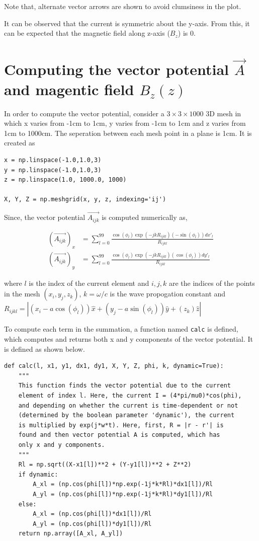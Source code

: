 \documentclass[12pt, a4paper]{article}
\begin{document}
Note that, alternate vector arrows are shown to avoid clumsiness in the plot.

It can be observed that the current is symmetric about the y-axis. From this, it can be expected that the magnetic field along z-axis ($B_z$) is 0.

\section{Computing the vector potential $\vec{A}$ and magentic field $B_z(z)$}

In order to compute the vector potential, consider a $3 \times 3 \times 1000$ 3D mesh in which x varies from -1cm to 1cm, y varies from -1cm to 1cm and z varies from 1cm to 1000cm. The seperation between each mesh point in a plane is 1cm. It is created as 

\begin{lstlisting}
x = np.linspace(-1.0,1.0,3)  
y = np.linspace(-1.0,1.0,3)
z = np.linspace(1.0, 1000.0, 1000)

X, Y, Z = np.meshgrid(x, y, z, indexing='ij')
\end{lstlisting}

Since, the vector potential $\vec{A_{ijk}}$ is computed numerically as,

\begin{align*}
\left( \vec{A_{ijk}} \right)_x &= \sum_{l = 0}^{99} \frac{\cos(\phi_l)\exp(-jkR_{ijkl})(-\sin(\phi_l))dx'_l}{R_{ijkl}} \\
\left( \vec{A_{ijk}} \right)_y &= \sum_{l = 0}^{99} \frac{\cos(\phi_l)\exp(-jkR_{ijkl})(\cos(\phi_l))dy'_l}{R_{ijkl}}
\end{align*}

where $l$ is the index of the current element and $i, j, k$ are the indices of the points in the mesh $(x_i, y_j, z_k)$, $k = \omega/c$ is the wave propogation constant and $R_{ijkl} = |(x_i - a \cos(\phi_l))\hat{x} + (y_j - a \sin(\phi_l))\hat{y} + (z_k)\hat{z}|$

To compute each term in the summation, a function named \texttt{calc} is defined, which computes and returns both x and y components of the vector potential. It is defined as shown below.

\begin{lstlisting}
def calc(l, x1, y1, dx1, dy1, X, Y, Z, phi, k, dynamic=True):
    """
    This function finds the vector potential due to the current
    element of index l. Here, the current I = (4*pi/mu0)*cos(phi),
    and depending on whether the current is time-dependent or not
    (determined by the boolean parameter 'dynamic'), the current
    is multiplied by exp(j*w*t). Here, first, R = |r - r'| is 
    found and then vector potential A is computed, which has 
    only x and y components.
    """
    Rl = np.sqrt((X-x1[l])**2 + (Y-y1[l])**2 + Z**2)
    if dynamic:
        A_xl = (np.cos(phi[l])*np.exp(-1j*k*Rl)*dx1[l])/Rl
        A_yl = (np.cos(phi[l])*np.exp(-1j*k*Rl)*dy1[l])/Rl
    else:
        A_xl = (np.cos(phi[l])*dx1[l])/Rl
        A_yl = (np.cos(phi[l])*dy1[l])/Rl
    return np.array([A_xl, A_yl])
\end{lstlisting}
\end{document}
